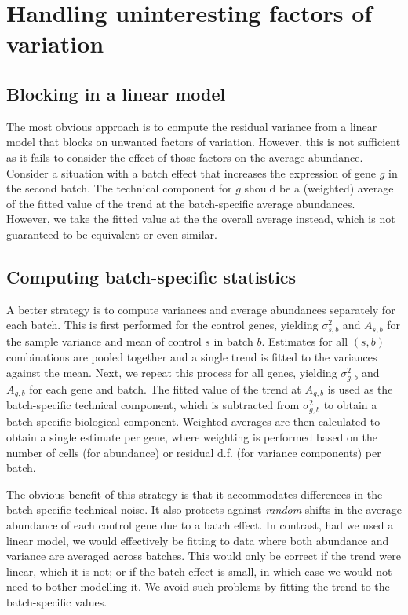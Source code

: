 \documentclass{article}
\begin{document}
\section{Handling uninteresting factors of variation}

\subsection{Blocking in a linear model}
The most obvious approach is to compute the residual variance from a linear model that blocks on unwanted factors of variation.
However, this is not sufficient as it fails to consider the effect of those factors on the average abundance.
Consider a situation with a batch effect that increases the expression of gene $g$ in the second batch.
The technical component for $g$ should be a (weighted) average of the fitted value of the trend at the batch-specific average abundances.
However, we take the fitted value at the the overall average instead, which is not guaranteed to be equivalent or even similar.

\subsection{Computing batch-specific statistics}
A better strategy is to compute variances and average abundances separately for each batch.
This is first performed for the control genes, yielding $\sigma^2_{s,b}$ and $A_{s,b}$ for the sample variance and mean of control $s$ in batch $b$.
Estimates for all $(s, b)$ combinations are pooled together and a single trend is fitted to the variances against the mean.
Next, we repeat this process for all genes, yielding $\sigma^2_{g,b}$ and $A_{g,b}$ for each gene and batch.
The fitted value of the trend at $A_{g,b}$ is used as the batch-specific technical component, which is subtracted from $\sigma^2_{g,b}$ to obtain a batch-specific biological component.
Weighted averages are then calculated to obtain a single estimate per gene, where weighting is performed based on the number of cells (for abundance) or residual d.f. (for variance components) per batch.

The obvious benefit of this strategy is that it accommodates differences in the batch-specific technical noise.
It also protects against \textit{random} shifts in the average abundance of each control gene due to a batch effect.
In contrast, had we used a linear model, we would effectively be fitting to data where both abundance and variance are averaged across batches.
This would only be correct if the trend were linear, which it is not;
or if the batch effect is small, in which case we would not need to bother modelling it.
We avoid such problems by fitting the trend to the batch-specific values.
\end{document}
